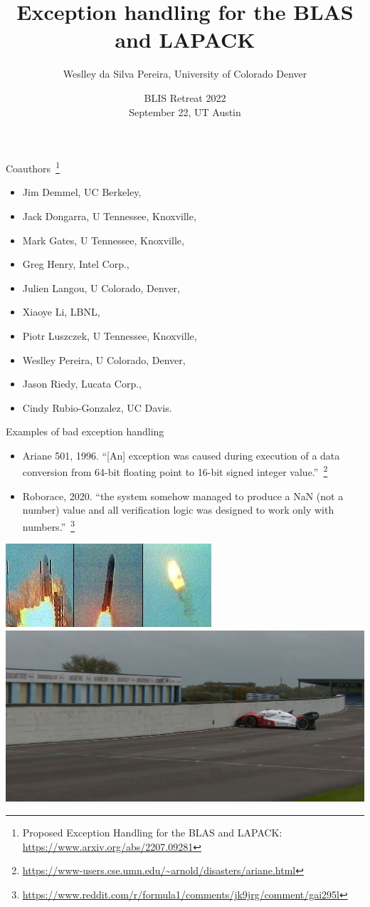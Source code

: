 \documentclass[11pt]{beamer}
\author{Weslley da Silva Pereira, University of Colorado Denver}
\title{Exception handling for the BLAS and LAPACK}
\date{BLIS Retreat 2022\\\vspace{10pt} September 22, UT Austin}
\begin{document}
\begin{frame}
\titlepage
\end{frame}

\begin{frame}{Coauthors~\footnote{Proposed Exception Handling
	for the BLAS and LAPACK:\\ \url{https://www.arxiv.org/abs/2207.09281}}}

	\begin{itemize}
		\item Jim Demmel, UC Berkeley,
		\item Jack Dongarra, U Tennessee, Knoxville,
		\item Mark Gates, U Tennessee, Knoxville,
		\item Greg Henry, Intel Corp.,
		\item Julien Langou, U Colorado, Denver,
		\item Xiaoye Li, LBNL,
		\item Piotr Luszczek, U Tennessee, Knoxville,
		\item Weslley Pereira, U Colorado, Denver,
		\item Jason Riedy, Lucata Corp.,
		\item Cindy Rubio-Gonzalez, UC Davis.
	\end{itemize}
	
\end{frame}

\begin{frame}{Examples of bad exception handling}

	\begin{itemize}
		\item Ariane 501, 1996. ``[An] exception was caused during execution of a data conversion from 64-bit floating point to 16-bit signed integer value.''~\footnote{\url{https://www-users.cse.umn.edu/~arnold/disasters/ariane.html}}
		\item Roborace, 2020. ``the system somehow managed to produce a NaN (not a number) value and all verification logic was designed to work only with numbers.''~\footnote{\url{https://www.reddit.com/r/formula1/comments/jk9jrg/comment/gai295l}}
	\end{itemize}

	\vspace{10pt}
	\begin{center}
		\includegraphics[width=.53\linewidth]{img/ariane}
		\hfill
		\includegraphics[width=.45\linewidth]{img/roborace}
	\end{center}
\end{frame}
\end{document}
